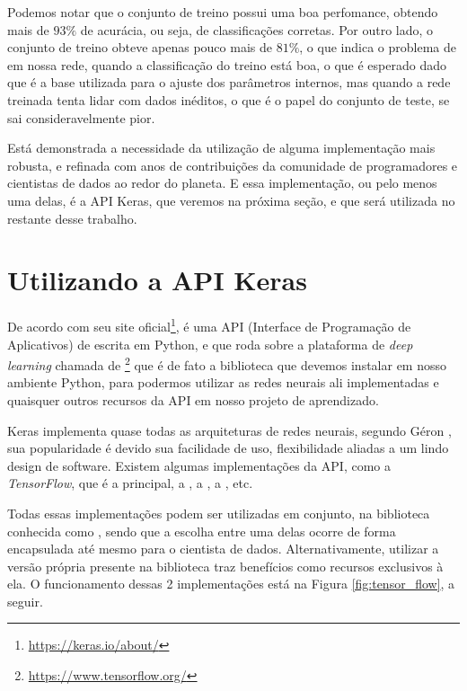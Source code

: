 Podemos notar que o conjunto de treino possui uma boa perfomance, obtendo mais de $93\%$ de acurácia, ou seja, de classificações corretas. Por outro lado, o conjunto de treino obteve apenas pouco mais de $81\%$, o que indica o problema de  em nossa rede, quando a classificação do treino está boa, o que é esperado dado que é a base utilizada para o ajuste dos parâmetros internos, mas quando a rede treinada tenta lidar com dados inéditos, o que é o papel do conjunto de teste, se sai consideravelmente pior.

Está demonstrada a necessidade da utilização de alguma implementação mais robusta, e refinada com anos de contribuições da comunidade de programadores e cientistas de dados ao redor do planeta. E essa implementação, ou pelo menos uma delas, é a API Keras, que veremos na próxima seção, e que será utilizada no restante desse trabalho.

\section{Utilizando a API Keras}

De acordo com seu site oficial\footnote{\url{https://keras.io/about/}},  é uma API (Interface de Programação de Aplicativos) de  escrita em Python, e que roda sobre a plataforma de \emph{deep learning} chamada de \footnote{\url{https://www.tensorflow.org/}} que é de fato a biblioteca que devemos instalar em nosso ambiente Python, para podermos utilizar as redes neurais ali implementadas e quaisquer outros recursos da API  em nosso projeto de aprendizado.

Keras implementa quase todas as arquiteturas de redes neurais, segundo Géron \citep{hands}, sua popularidade é devido sua facilidade de uso, flexibilidade aliadas a um lindo design de software. Existem algumas implementações da API, como a \emph{TensorFlow}, que é a principal, a , a , a , etc. 

Todas essas implementações podem ser utilizadas em conjunto, na biblioteca conhecida como , sendo que a escolha entre uma delas ocorre de forma encapsulada até mesmo para o cientista de dados. Alternativamente, utilizar a versão própria presente na biblioteca  traz benefícios como recursos exclusivos à ela. O funcionamento dessas 2 implementações está na Figura \ref{fig:tensor_flow}, a seguir.

